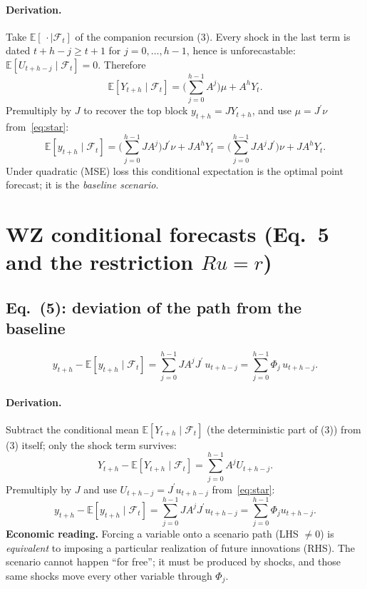 \documentclass[11pt]{article}
\newcommand{\E}{\mathbb{E}}
\newcommand{\Fset}{\mathcal{F}}
\newcommand{\tp}{^{\prime}}
\theoremstyle{remark}
\begin{document}
\paragraph{Derivation.} Take $\E[\,\cdot\mid\Fset_t]$ of the companion recursion
(3). Every shock in the last term is dated $t+h-j\ge t+1$ for $j=0,\dots,h-1$,
hence is unforecastable: $\E[U_{t+h-j}\mid\Fset_t]=0$. Therefore
\[
\E[Y_{t+h}\mid\Fset_t]=\Bigg(\sum_{j=0}^{h-1}A^{j}\Bigg)\mu + A^{h}Y_t .
\]
Premultiply by $J$ to recover the top block $y_{t+h}=JY_{t+h}$, and use
$\mu=J\tp\nu$ from~\eqref{eq:star}:
\[
\E[y_{t+h}\mid\Fset_t]
=\Bigg(\sum_{j=0}^{h-1}JA^{j}\Bigg)J\tp\nu + JA^{h}Y_t
=\Bigg(\sum_{j=0}^{h-1}JA^{j}J\tp\Bigg)\nu + JA^{h}Y_t.
\]
Under quadratic (MSE) loss this conditional expectation is the optimal point
forecast; it is the \emph{baseline scenario}.

\section{WZ conditional forecasts (Eq.~5 and the restriction $Ru=r$)}
\subsection*{Eq.~(5): deviation of the path from the baseline}
\begin{equation}
y_{t+h}-\E\!\left[y_{t+h}\mid\Fset_t\right]
=\sum_{j=0}^{h-1}JA^{j}J\tp\,u_{t+h-j}
=\sum_{j=0}^{h-1}\Phi_j\,u_{t+h-j}. \tag{5}
\end{equation}

\paragraph{Derivation.} Subtract the conditional mean $\E[Y_{t+h}\mid\Fset_t]$
(the deterministic part of (3)) from (3) itself; only the shock term survives:
\[
Y_{t+h}-\E[Y_{t+h}\mid\Fset_t]=\sum_{j=0}^{h-1}A^{j}U_{t+h-j}.
\]
Premultiply by $J$ and use $U_{t+h-j}=J\tp u_{t+h-j}$ from~\eqref{eq:star}:
\[
y_{t+h}-\E[y_{t+h}\mid\Fset_t]
=\sum_{j=0}^{h-1}JA^{j}J\tp u_{t+h-j}
=\sum_{j=0}^{h-1}\Phi_j u_{t+h-j}. 
\]
\textbf{Economic reading.} Forcing a variable onto a scenario path (LHS
$\neq 0$) is \emph{equivalent} to imposing a particular realization of future
innovations (RHS). The scenario cannot happen ``for free''; it must be produced
by shocks, and those same shocks move every other variable through $\Phi_j$.
\end{document}
